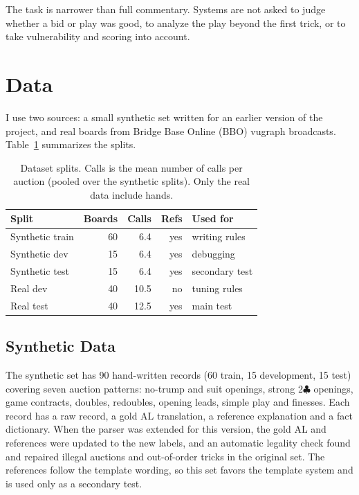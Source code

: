 \documentclass[11pt]{article}
\newcommand{\suitC}{$\clubsuit$}
\begin{document}
The task is narrower than full commentary. Systems are not asked to judge whether a bid or play was good, to analyze the play beyond the first trick, or to take vulnerability and scoring into account.

\section{Data}

I use two sources: a small synthetic set written for an earlier version of the project, and real boards from Bridge Base Online (BBO) vugraph broadcasts. Table~\ref{tab:data} summarizes the splits.

\begin{table}[t]
\centering
\small
\begin{tabular}{lrrrl}
\toprule
Split & Boards & Calls & Refs & Used for \\
\midrule
Synthetic train & 60 & 6.4 & yes & writing rules \\
Synthetic dev & 15 & 6.4 & yes & debugging \\
Synthetic test & 15 & 6.4 & yes & secondary test \\
Real dev & 40 & 10.5 & no & tuning rules \\
Real test & 40 & 12.5 & yes & main test \\
\bottomrule
\end{tabular}
\caption{Dataset splits. Calls is the mean number of calls per auction (pooled over the synthetic splits). Only the real data include hands.}
\label{tab:data}
\end{table}

\subsection{Synthetic Data}

The synthetic set has 90 hand-written records (60 train, 15 development, 15 test) covering seven auction patterns: no-trump and suit openings, strong 2\suitC{} openings, game contracts, doubles, redoubles, opening leads, simple play and finesses. Each record has a raw record, a gold AL translation, a reference explanation and a fact dictionary. When the parser was extended for this version, the gold AL and references were updated to the new labels, and an automatic legality check found and repaired illegal auctions and out-of-order tricks in the original set. The references follow the template wording, so this set favors the template system and is used only as a secondary test.
\end{document}
